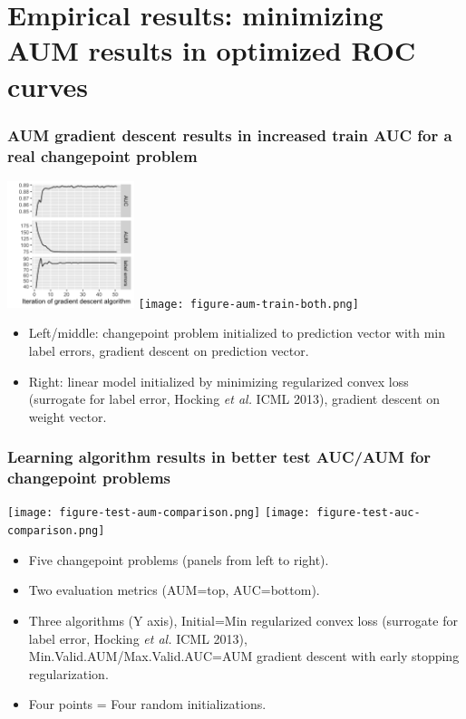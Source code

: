 \documentclass[t]{beamer}
\begin{document}
\section{Empirical results: minimizing AUM results in optimized ROC curves}

\begin{frame}
  \frametitle{AUM gradient descent results in increased train AUC for
    a real changepoint problem}

\includegraphics[height=3.7cm]{figure-aum-optimized-iterations.png}
\texttt{[image: figure-aum-train-both.png]}

\begin{itemize}
\item Left/middle: changepoint problem initialized to prediction vector with
  min label errors, gradient descent on prediction vector.
\item Right: linear model initialized by minimizing regularized convex
  loss (surrogate for label error, Hocking \emph{et al.} ICML 2013),
  gradient descent on weight vector.
\end{itemize}

\end{frame}

\begin{frame}
  \frametitle{Learning algorithm results in better test AUC/AUM for changepoint problems}
    
\texttt{[image: figure-test-aum-comparison.png]}
\texttt{[image: figure-test-auc-comparison.png]}

\begin{itemize}
\item Five changepoint problems (panels from left to right).
\item Two evaluation metrics (AUM=top, AUC=bottom).
\item Three algorithms (Y axis), Initial=Min regularized convex loss
  (surrogate for label error, Hocking \emph{et al.} ICML 2013), Min.Valid.AUM/Max.Valid.AUC=AUM
  gradient descent with early stopping regularization.
\item Four points = Four random initializations.
\end{itemize}

\end{frame}
\end{document}
